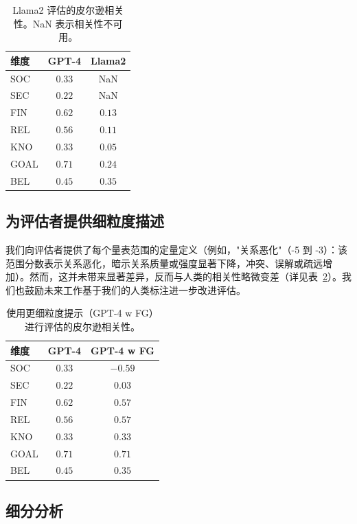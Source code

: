 \documentclass[11pt,a4paper]{article}
\begin{document}
\begin{table}[htbp]
\centering
\small
\begin{tabular}{lcc}
\toprule
维度 & GPT-4 & Llama2 \\
\midrule
SOC & $0.33$ & NaN \\
SEC & $0.22$ & NaN \\
FIN & $0.62$ & $0.13$ \\
REL & $0.56$ & $0.11$ \\
KNO & $0.33$ & $0.05$ \\
GOAL & $0.71$ & $0.24$ \\
BEL & $0.45$ & $0.35$ \\
\bottomrule
\end{tabular}
\caption{Llama2 评估的皮尔逊相关性。NaN 表示相关性不可用。}
\label{tab:llama2eval}
\end{table}

\subsection{为评估者提供细粒度描述}

我们向评估者提供了每个量表范围的定量定义（例如，"关系恶化"（-5 到 -3）：该范围分数表示关系恶化，暗示关系质量或强度显著下降，冲突、误解或疏远增加）。然而，这并未带来显著差异，反而与人类的相关性略微变差（详见表~\ref{tab:finegrained}）。我们也鼓励未来工作基于我们的人类标注进一步改进评估。

\begin{table}[htbp]
\centering
\small
\begin{tabular}{lcc}
\toprule
维度 & GPT-4 & GPT-4 w FG \\
\midrule
SOC & $0.33$ & $-0.59$ \\
SEC & $0.22$ & $0.03$ \\
FIN & $0.62$ & $0.57$ \\
REL & $0.56$ & $0.57$ \\
KNO & $0.33$ & $0.33$ \\
GOAL & $0.71$ & $0.71$ \\
BEL & $0.45$ & $0.35$ \\
\bottomrule
\end{tabular}
\caption{使用更细粒度提示（GPT-4 w FG）进行评估的皮尔逊相关性。}
\label{tab:finegrained}
\end{table}

\subsection{细分分析}
\end{document}
